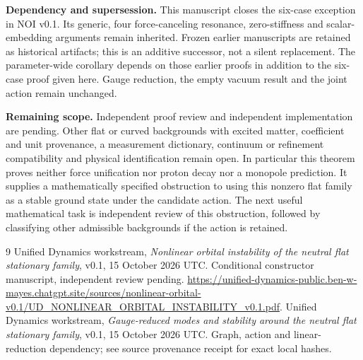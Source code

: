 \documentclass[11pt,a4paper]{article}
\begin{document}
\textbf{Dependency and supersession.} This manuscript closes the six-case exception in NOI v0.1. Its generic, four force-canceling resonance, zero-stiffness and scalar-embedding arguments remain inherited. Frozen earlier manuscripts are retained as historical artifacts; this is an additive successor, not a silent replacement. The parameter-wide corollary depends on those earlier proofs in addition to the six-case proof given here. Gauge reduction, the empty vacuum result and the joint action remain unchanged.

\textbf{Remaining scope.} Independent proof review and independent implementation are pending. Other flat or curved backgrounds with excited matter, coefficient and unit provenance, a measurement dictionary, continuum or refinement compatibility and physical identification remain open. In particular this theorem proves neither force unification nor proton decay nor a monopole prediction. It supplies a mathematically specified obstruction to using this nonzero flat family as a stable ground state under the candidate action. The next useful mathematical task is independent review of this obstruction, followed by classifying other admissible backgrounds if the action is retained.

\begin{thebibliography}{9}
 Unified Dynamics workstream, \emph{Nonlinear orbital instability of the neutral flat stationary family}, v0.1, 15 October 2026 UTC. Conditional constructor manuscript, independent review pending. \url{https://unified-dynamics-public.ben-w-mayes.chatgpt.site/sources/nonlinear-orbital-v0.1/UD_NONLINEAR_ORBITAL_INSTABILITY_v0.1.pdf}.
 Unified Dynamics workstream, \emph{Gauge-reduced modes and stability around the neutral flat stationary family}, v0.1, 15 October 2026 UTC. Graph, action and linear-reduction dependency; see source provenance receipt for exact local hashes.
\end{thebibliography}
\end{document}
